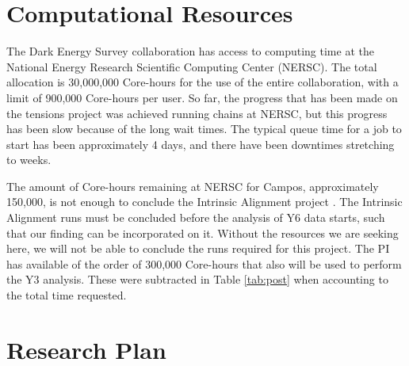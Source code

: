 \documentclass[12pt]{article}
\begin{document}
\begin{small}
\begin{table}[h!]
\begin{center}
\caption{Markov Chain Monte Carlos to be run on DES data and simulations. The first block, above the horizontal line, is for the intrinsic alignment project and requires multinest chains to be run on 20 sets of simulated DES data, each generated from a cosmology either NLA or TATT model of IA. %
The block of runs below the line mimics that required to complete the Y6 DES analysis. Of order fifty chains will be needed from start to finish on different subsets of the data and using different models. Then, production runs will be required including several dozen on DES data combined with other external data sets.}
\label{tab:post}
\end{center}
\end{table}


\section{Computational Resources}

The Dark Energy Survey collaboration has access to computing time at the National Energy Research Scientific Computing Center (NERSC). The total allocation is 30,000,000 Core-hours for the use of the entire collaboration, with a  limit of 900,000 Core-hours per user. So far, the progress that has been made on the tensions project was achieved running chains at NERSC, but this progress has been slow because of the long wait times. The typical queue time for a job to start has been approximately 4 days, and there have been downtimes stretching to weeks. 

The amount of Core-hours remaining at NERSC for Campos, approximately 150,000, is not enough to conclude the Intrinsic Alignment project . The Intrinsic Alignment runs must be concluded before the analysis of Y6 data starts, such that our finding can be incorporated on it. Without the resources we are seeking here, we will not be able to conclude the runs required for this project. The PI has available of the order of 300,000 Core-hours that also will be used to perform the Y3 analysis. These were subtracted in Table \ref{tab:post} when accounting to the total time requested.




\section{Research Plan}


\end{small}
\end{document}
